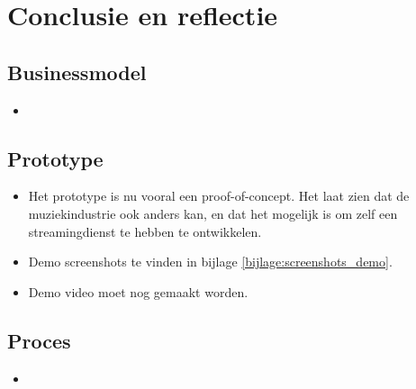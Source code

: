 \section{Conclusie en reflectie}


\subsection{Businessmodel}
\begin{itemize}
  \item 
\end{itemize}

\subsection{Prototype}
\begin{itemize}
  \item Het prototype is nu vooral een proof-of-concept. Het laat zien dat de muziekindustrie ook anders kan, en dat het mogelijk is om zelf een streamingdienst te hebben te ontwikkelen.
  \item Demo screenshots te vinden in bijlage \ref{bijlage:screenshots_demo}.
  \item Demo video moet nog gemaakt worden.
\end{itemize}

\subsection{Proces}
\begin{itemize}
  \item 
\end{itemize}

